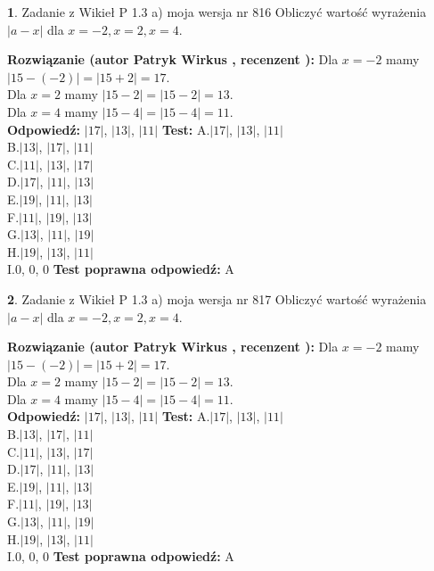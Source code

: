 \documentclass[12pt, a4paper]{article}
\theoremstyle{definition} %
\newtheorem{zad}{}
\newcommand{\zadStart}[1]{\begin{zad}#1\newline}
\newcommand{\zadStop}{\end{zad}}
\newcommand{\rozwStart}[2]{\noindent \textbf{Rozwiązanie (autor #1 , recenzent #2): }\newline}
\newcommand{\rozwStop}{\newline}
\newcommand{\odpStart}{\noindent \textbf{Odpowiedź:}\newline}
\newcommand{\odpStop}{\newline}
\newcommand{\testStart}{\noindent \textbf{Test:}\newline}
\newcommand{\testStop}{\newline}
\newcommand{\kluczStart}{\noindent \textbf{Test poprawna odpowiedź:}\newline}
\newcommand{\kluczStop}{\newline}
\begin{document}
\zadStart{Zadanie z Wikieł P 1.3 a) moja wersja nr 816}
Obliczyć wartość wyrażenia $|a - x|$ dla $x=-2,x=2,x=4$.
\zadStop
\rozwStart{Patryk Wirkus}{}
Dla $x = -2$ mamy $|15 - (-2)| = |15 + 2| = 17$.\\
Dla $x = 2$ mamy $|15 - 2| = |15 - 2| = 13$.\\
Dla $x = 4$ mamy $|15 - 4| = |15 - 4| = 11$.\\
\rozwStop
\odpStart
$|17|$, $|13|$, $|11|$
\odpStop
\testStart
A.$|17|$, $|13|$, $|11|$\\
B.$|13|$, $|17|$, $|11|$\\
C.$|11|$, $|13|$, $|17|$\\
D.$|17|$, $|11|$, $|13|$\\
E.$|19|$, $|11|$, $|13|$\\
F.$|11|$, $|19|$, $|13|$\\
G.$|13|$, $|11|$, $|19|$\\
H.$|19|$, $|13|$, $|11|$\\
I.$0$, $0$, $0$
\testStop
\kluczStart
A
\kluczStop



\zadStart{Zadanie z Wikieł P 1.3 a) moja wersja nr 817}
Obliczyć wartość wyrażenia $|a - x|$ dla $x=-2,x=2,x=4$.
\zadStop
\rozwStart{Patryk Wirkus}{}
Dla $x = -2$ mamy $|15 - (-2)| = |15 + 2| = 17$.\\
Dla $x = 2$ mamy $|15 - 2| = |15 - 2| = 13$.\\
Dla $x = 4$ mamy $|15 - 4| = |15 - 4| = 11$.\\
\rozwStop
\odpStart
$|17|$, $|13|$, $|11|$
\odpStop
\testStart
A.$|17|$, $|13|$, $|11|$\\
B.$|13|$, $|17|$, $|11|$\\
C.$|11|$, $|13|$, $|17|$\\
D.$|17|$, $|11|$, $|13|$\\
E.$|19|$, $|11|$, $|13|$\\
F.$|11|$, $|19|$, $|13|$\\
G.$|13|$, $|11|$, $|19|$\\
H.$|19|$, $|13|$, $|11|$\\
I.$0$, $0$, $0$
\testStop
\kluczStart
A
\kluczStop
\end{document}
